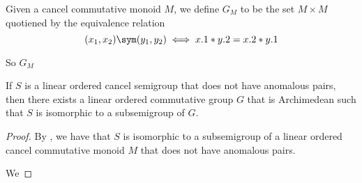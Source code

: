 \begin{definition}\label{def:with_division}
    \leanok
    Given a cancel commutative monoid $M$,
    we define $G_M$ to be the set $M\times M$
    quotiened by the equivalence relation
    \[
    (x_1,x_2)\sym (y_1,y_2) \iff x.1*y.2 = x.2*y.1
    \]
    
    So $G_M$ 
\end{definition}


\begin{theorem}\label{to_arch_group}
    \leanok
    If $S$ is a linear ordered cancel semigroup
    that does not have anomalous pairs, then
    there exists a linear ordered commutative group $G$
    that is Archimedean
    such that $S$ is isomorphic to a subsemigroup of $G$.
\end{theorem}
\begin{proof}\leanok
By , we have that
$S$ is isomorphic to a subsemigroup of a
linear ordered cancel commutative monoid $M$ that
does not have anomalous pairs.

We 
\end{proof}